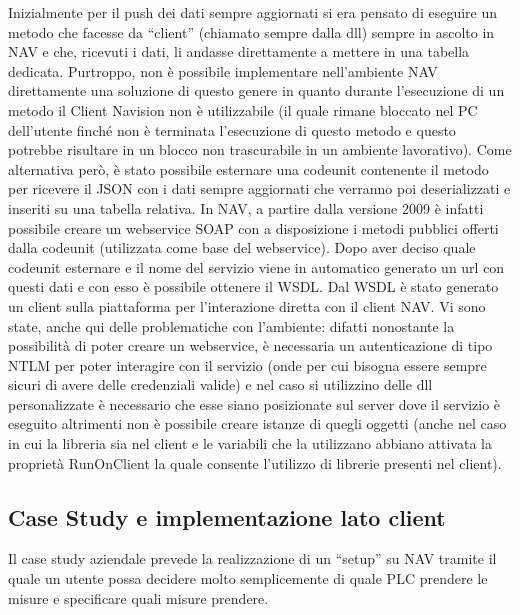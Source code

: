 Inizialmente per il push dei dati sempre aggiornati si era pensato di eseguire un metodo che facesse da “client” (chiamato sempre dalla dll) sempre in ascolto in NAV e che, ricevuti i dati, li andasse direttamente a mettere in una tabella dedicata. Purtroppo, non è possibile implementare nell’ambiente NAV direttamente una soluzione di questo genere in quanto durante l’esecuzione di un metodo il Client Navision non è utilizzabile (il quale rimane bloccato nel PC dell’utente finché non è terminata l’esecuzione di questo metodo e questo potrebbe risultare in un blocco non trascurabile in un ambiente lavorativo). Come alternativa però, è stato possibile esternare una codeunit contenente il metodo per ricevere il JSON con i dati sempre aggiornati che verranno poi deserializzati e inseriti su una tabella relativa. In NAV, a partire dalla versione 2009 è infatti possibile creare un webservice SOAP con a disposizione i metodi pubblici offerti dalla codeunit (utilizzata come base del webservice). Dopo aver deciso quale codeunit esternare e il nome del servizio viene in automatico generato un url con questi dati e con esso è possibile ottenere il WSDL. Dal WSDL è stato generato un client sulla piattaforma per l’interazione diretta con il client NAV. Vi sono state, anche qui delle problematiche con l’ambiente: difatti nonostante la possibilità di poter creare un webservice, è necessaria un autenticazione di tipo NTLM per poter interagire con il servizio (onde per cui bisogna essere sempre sicuri di avere delle credenziali valide) e nel caso si utilizzino delle dll personalizzate è necessario che esse siano posizionate sul server dove il servizio è eseguito altrimenti non è possibile creare istanze di quegli oggetti (anche nel caso in cui la libreria sia nel client e le variabili che la utilizzano abbiano attivata la proprietà RunOnClient la quale consente l’utilizzo di librerie presenti nel client).
\subsection{Case Study e implementazione lato client}
Il case study aziendale prevede la realizzazione di un “setup” su NAV tramite il quale un utente possa decidere molto semplicemente di quale PLC prendere le misure e specificare quali misure prendere.

